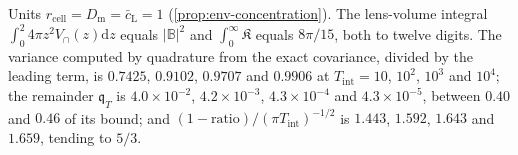 \begin{numcheck}\label{chk:env-concentration}
Units $r_{\mathrm{cell}}=D_{\mathrm m}=\bar c_{\mathrm L}=1$ (\cref{prop:env-concentration}). The lens-volume integral $\int_0^{2}4\pi z^2V_\cap(z)\mathrm dz$ equals $\lvert\mathbb B\rvert^2$ and $\int_0^\infty\mathfrak K$ equals $8\pi/15$, both to twelve digits. The variance computed by quadrature from the exact covariance, divided by the leading term, is $0.7425$, $0.9102$, $0.9707$ and $0.9906$ at $T_{\mathrm{int}}=10$, $10^2$, $10^3$ and $10^4$; the remainder $\mathfrak q_T$ is $4.0\times10^{-2}$, $4.2\times10^{-3}$, $4.3\times10^{-4}$ and $4.3\times10^{-5}$, between $0.40$ and $0.46$ of its bound; and $(1-\text{ratio})/(\pi T_{\mathrm{int}})^{-1/2}$ is $1.443$, $1.592$, $1.643$ and $1.659$, tending to $5/3$.
\end{numcheck}


